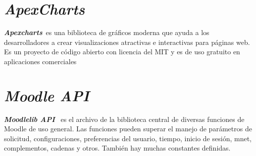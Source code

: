 \section{\textit{ApexCharts}}
\textbf{\textit{Apexcharts}}~\cite{ApexChart}es una biblioteca de gráficos moderna que ayuda a los desarrolladores a crear visualizaciones atractivas e interactivas para páginas web.
Es un proyecto de código abierto con licencia del MIT y es de uso gratuito en aplicaciones comerciales

\section{\textit{Moodle API}}
\textbf{\textit{Moodlelib API}}~\cite{MoodleAPI} es el archivo de la biblioteca central de diversas funciones de Moodle de uso general. Las funciones pueden superar el manejo de parámetros de solicitud, configuraciones, preferencias del usuario, tiempo, inicio de sesión, mnet, complementos, cadenas y otros. También hay muchas constantes definidas.

